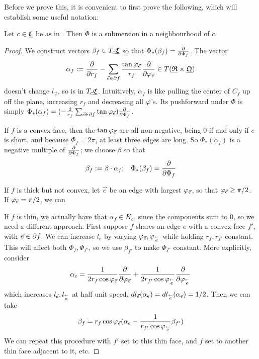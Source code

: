 Before we prove this, it is convenient to first prove the following,
which will establish some useful notation:

\begin{lemma}
\label{l:Phi_full}
Let $c \in {\underline{\mathfrak{C}}}$ be as in .
Then $\Phi$ is a submersion in a neighbourhood of $c$.
\end{lemma}

\begin{proof}
We construct vectors $\beta_f \in T_c {\underline{\mathfrak{C}}}$ so that
$\Phi_*(\beta_f) = {\frac{\partial}{\partial \Phi_f}}$.
The vector
\begin{equation}
\label{e:alpha_f}
\alpha_f := {\frac{\partial}{\partial r_f}} - \sum_{\vec{e} \in \partial f} 
	\frac{\tan \varphi_{\vec{e}}}{r_f} {\frac{\partial}{\partial \varphi_{\vec{e}}}}
	\in T({\underline{\mathfrak{R}}} \times {\underline{\mathfrak{Q}}})
\end{equation}
doesn't change $l_{\vec{e}}$,
so is in $T_c {\underline{\mathfrak{C}}}$.
Intuitively, $\alpha_f$ is like
pulling the center of $C_f$ up off the plane, increasing $r_f$ and decreasing all
$\varphi$'s.
Its pushforward under $\Phi$ is simply
$\Phi_*(\alpha_f) =
	(-\frac{2}{r_f} \sum_{\vec{e}\in \partial f} \tan \varphi_{\vec{e}})
	{\frac{\partial}{\partial \Phi_f}}$.


If $f$ is a convex face, then the $\tan \varphi_{\vec{e}}$ are all non-negative,
being 0 if and only if $e$ is short,
and because $\Phi_f = 2\pi$, at least three edges are long.
So $\Phi_*(\alpha_f)$ is a negative multiple of ${\frac{\partial}{\partial \Phi_f}}$;
we choose $\beta$ so that
\begin{equation}
\label{e:beta_f_convex}
\beta_f := \beta \cdot \alpha_f; \;\;\;
\Phi_*(\beta_f) = {\frac{\partial}{\partial \Phi_f}}
\end{equation}

If $f$ is thick but not convex,
let $\vec{e}$ be an edge with largest $\varphi_{\vec{e}}$,
so that $\varphi_{\vec{e}} \geq \pi/2$.
If $\varphi_{\vec{e}} = \pi/2$,
we can 



If $f$ is thin, we actually have that $\alpha_f \in K_c$,
since the components sum to 0, so we need a different approach.
First suppose $f$ shares an edge $e$ with a convex face $f'$,
with $\vec{e} \in \partial f$.
We can increase $l_e$
by varying $\varphi_{\vec{e}},\varphi_{\overset{\leftarrow}{e}}$
while holding $r_f,r_{f'}$ constant.
This will affect both $\Phi_f, \Phi_{f'}$,
so we use $\beta_{f'}$ to make $\Phi_{f'}$ constant.
More explicitly, consider
\begin{equation}
\label{e:alpha_e}
\alpha_e = \frac{1}{2 r_f \cos \varphi_{\vec{e}}} {\frac{\partial}{\partial \varphi_{\vec{e}}}}
+ \frac{1}{2 r_{f'}\cos \varphi_{\overset{\leftarrow}{e}}} {\frac{\partial}{\partial \varphi_{\overset{\leftarrow}{e}}}}
\end{equation}
which increases $l_{\vec{e}}, l_{\overset{\leftarrow}{e}}$ at half unit speed,
$dl_{\vec{e}}(\alpha_e) = dl_{\overset{\leftarrow}{e}}(\alpha_e) = 1/2$.
Then we can take
\begin{equation}
\label{e:beta_f_thin}
\beta_f = r_f \cos \varphi_{\vec{e}}
	(\alpha_e - \frac{1}{r_{f'} \cos \varphi_{\overset{\leftarrow}{e}}} \beta_{f'})
\end{equation}
We can repeat this procedure with $f'$ set to this thin face,
and $f$ set to another thin face adjacent to it, etc.
\end{proof}

